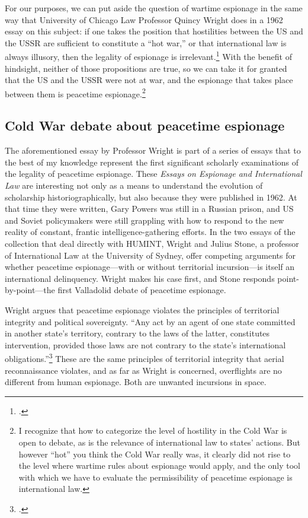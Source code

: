 \documentclass{report}
\begin{document}
\begin{refsegment}
For our purposes, we can put aside the question of wartime espionage in the same way that University of Chicago Law Professor Quincy Wright does in a 1962 essay on this subject: if one takes the position that hostilities between the US and the USSR are sufficient to constitute a ``hot war,'' or that international law is always illusory, then the legality of espionage is irrelevant.\footcite[p.~8]{wright_espionage_1962} With the benefit of hindsight, neither of those propositions are true, so we can take it for granted that the US and the USSR were not at war, and the espionage that takes place between them is peacetime espionage.\footnote{I recognize that how to categorize the level of hostility in the Cold War is open to debate, as is the relevance of international law to states' actions. But however ``hot'' you think the Cold War really was, it clearly did not rise to the level where wartime rules about espionage would apply, and the only tool with which we have to evaluate the permissibility of peacetime espionage is international law.}

\subsection{Cold War debate about peacetime espionage}
The aforementioned essay by Professor Wright is part of a series of essays that to the best of my knowledge represent the first significant scholarly examinations of the legality of peacetime espionage. These \emph{Essays on Espionage and International Law} are interesting not only as a means to understand the evolution of scholarship historiographically, but also because they were published in 1962. At that time they were written, Gary Powers was still in a Russian prison, and US and Soviet policymakers were still grappling with how to respond to the new reality of constant, frantic intelligence-gathering efforts. In the two essays of the collection that deal directly with HUMINT, Wright and Julius Stone, a professor of International Law at the University of Sydney, offer competing arguments for whether peacetime espionage---with or without territorial incursion---is itself an international delinquency. Wright makes his case first, and Stone responds point-by-point---the first Valladolid debate of peacetime espionage.

Wright argues that peacetime espionage violates the principles of territorial integrity and political sovereignty. ``Any act by an agent of one state committed in another state's territory, contrary to the laws of the latter, constitutes intervention, provided those laws are not contrary to the state's international obligations.''\footcite[p.~13]{wright_espionage_1962} These are the same principles of territorial integrity that aerial reconnaissance violates, and as far as Wright is concerned, overflights are no different from human espionage. Both are unwanted incursions in space.


\end{refsegment}
\end{document}
